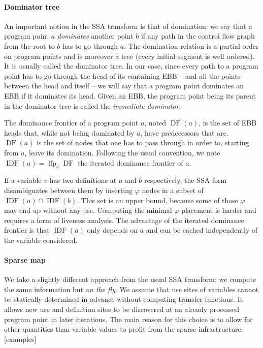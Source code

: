 \documentclass[11pt]{article}
\renewcommand{\phi}{\varphi}
\DeclareMathOperator{\lfp}{lfp}
\DeclareMathOperator{\DF}{DF}
\DeclareMathOperator{\IDF}{IDF}
\begin{document}
\paragraph{Dominator tree} An important notion in the SSA transform is that of domination: we say that a program point $a$ \emph{dominates} another point $b$ if any path in the control flow graph from the root to $b$ has to go through $a$. The domination relation is a partial order on program points and is moreover a tree (every initial segment is well ordered). It is usually called the dominator tree. In our case, since every path to a program point has to go through the head of its containing EBB -- and all the points between the head and itself -- we will say that a program point dominates an EBB if it dominates its head. Given an EBB, the program point being its parent in the dominator tree is called the \emph{immediate dominator}.

The dominance frontier of a program point $a$, noted $\DF(a)$, is the set of EBB heads that, while not being dominated by $a$, have predecessors that are. $\DF(a)$ is the set of nodes that one has to pass through in order to, starting from $a$, leave its domination.
Following the usual convention, we note $\IDF(a) = \lfp_a\DF$ the iterated dominance frontier of $a$.

If a variable $v$ has two definitions at $a$ and $b$ respectively, the SSA form disambiguates between them by inserting $\phi$ nodes in a subset of $\IDF(a)\cap\IDF(b)$.
This set is an upper bound, because some of those $\phi$ may end up without any use. Computing the minimal $\phi$ placement is harder and requires a form of liveness analysis.
The advantage of the iterated dominance frontier is that $\IDF(a)$ only depends on $a$ and can be cached independently of the variable considered.

\paragraph{Sparse map} We take a slightly different approach from the usual SSA transform: we compute the same information but \emph{on the fly}. We assume that use sites of variables cannot be statically determined in advance without computing transfer functions.
It allows new use and definition sites to be discovered at an already processed program point in later iterations.
The main reason for this choice is to allow for other quantities than variable values to profit from the sparse infrastructure.
[examples]
\end{document}

